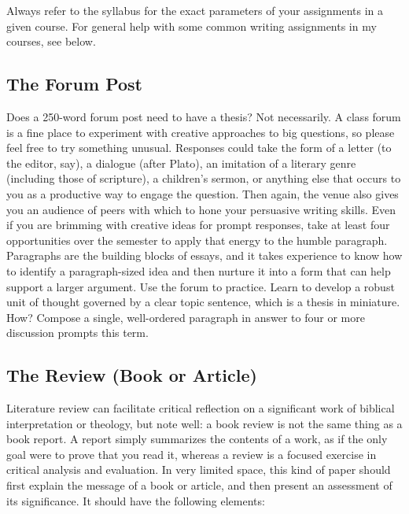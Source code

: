 \documentclass[11pt,twocolumn]{article}
\begin{document}
Always refer to the syllabus for the exact parameters of your
assignments in a given course. For general help with some common writing
assignments in my courses, see below.

\subsection{The Forum Post}

Does a 250-word forum post need to have a thesis? Not necessarily. A
class forum is a fine place to experiment with creative approaches to
big questions, so please feel free to try something unusual. Responses
could take the form of a letter (to the editor, say), a dialogue (after
Plato), an imitation of a literary genre (including those of scripture),
a children's sermon, or anything else that occurs to you as a productive
way to engage the question. Then again, the venue also gives you an
audience of peers with which to hone your persuasive writing skills.
Even if you are brimming with creative ideas for prompt responses, take
at least four opportunities over the semester to apply that energy to
the humble paragraph. Paragraphs are the building blocks of essays, and
it takes experience to know how to identify a paragraph-sized idea and
then nurture it into a form that can help support a larger argument. Use
the forum to practice. Learn to develop a robust unit of thought
governed by a clear topic sentence, which is a thesis in miniature. How?
Compose a single, well-ordered paragraph in answer to four or more
discussion prompts this term.

\subsection{The Review (Book or Article)}

Literature review can facilitate critical reflection on a significant
work of biblical interpretation or theology, but note well: a book
review is not the same thing as a book report. A report simply
summarizes the contents of a work, as if the only goal were to prove
that you read it, whereas a review is a focused exercise in critical
analysis and evaluation. In very limited space, this kind of paper
should first explain the message of a book or article, and then present
an assessment of its significance. It should have the following
elements:
\end{document}
